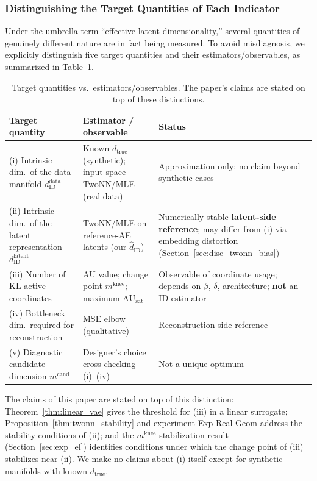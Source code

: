 \documentclass[make,article,submit,pdftex,moreauthors]{Definitions/mdpi}
\newcommand{\dzopt}{m^{\mathrm{cand}}}
\newcommand{\dtrue}{d_{\mathrm{true}}}
\newcommand{\AUsat}{\mathrm{AU}_{\mathrm{sat}}}
\newcommand{\mknee}{m^{\mathrm{knee}}}
\newcommand{\hatdID}{\hat{d}_{\mathrm{ID}}}
\begin{document}
\subsubsection*{Distinguishing the Target Quantities of Each Indicator}\label{sec:framework_targets}

Under the umbrella term ``effective latent dimensionality,'' several quantities
of genuinely different nature are in fact being measured.
To avoid misdiagnosis, we explicitly distinguish five target quantities and
their estimators/observables, as summarized in Table~\ref{tab:target_estimator}.

\begin{table}[H]
\caption{Target quantities vs.\ estimators/observables. The paper's claims are stated on top of these distinctions.}
\label{tab:target_estimator}
\begin{tabularx}{\textwidth}{p{4.4cm}p{4.0cm}X}
\toprule
\textbf{Target quantity} & \textbf{Estimator / observable} & \textbf{Status} \\
\midrule
(i) Intrinsic dim.\ of the data manifold $d_\mathrm{ID}^\mathrm{data}$ & Known $\dtrue$ (synthetic); input-space TwoNN/MLE (real data) & Approximation only; no claim beyond synthetic cases \\
(ii) Intrinsic dim.\ of the latent representation $d_\mathrm{ID}^\mathrm{latent}$ & TwoNN/MLE on reference-AE latents (our $\hatdID$) & Numerically stable \textbf{latent-side reference}; may differ from (i) via embedding distortion (Section~\ref{sec:disc_twonn_bias}) \\
(iii) Number of KL-active coordinates & AU value; change point $\mknee$; maximum $\AUsat$ & Observable of coordinate usage; depends on $\beta$, $\delta$, architecture; \textbf{not} an ID estimator \\
(iv) Bottleneck dim.\ required for reconstruction & MSE elbow (qualitative) & Reconstruction-side reference \\
(v) Diagnostic candidate dimension $\dzopt$ & Designer's choice cross-checking (i)--(iv) & Not a unique optimum \\
\bottomrule
\end{tabularx}
\end{table}

The claims of this paper are stated on top of this distinction:
Theorem~\ref{thm:linear_vae} gives the threshold for (iii) in a linear surrogate;
Proposition~\ref{thm:twonn_stability} and experiment Exp-Real-Geom address the
stability conditions of (ii); and the $\mknee$ stabilization result
(Section~\ref{sec:exp_el}) identifies conditions under which the change point of
(iii) stabilizes near (ii).
We make no claims about (i) itself except for synthetic manifolds with known
$\dtrue$.
\end{document}

